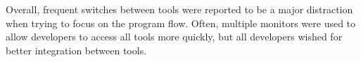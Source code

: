 Overall, frequent switches between tools were reported to be a major distraction when trying to focus on the program flow.
Often, multiple monitors were used to allow developers to access all tools more quickly, but all developers wished for better integration between tools.
\tmpEnd

%
%
%



